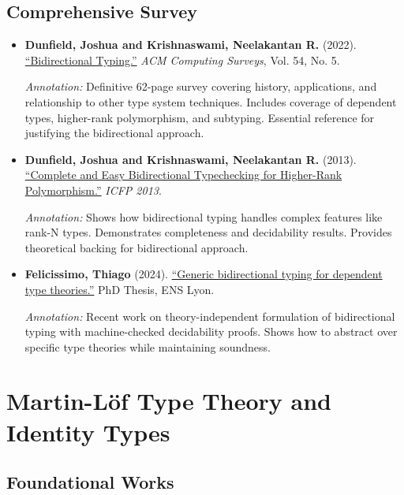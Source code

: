 \documentclass[11pt]{article}
\begin{document}
\subsection{Comprehensive Survey}

\begin{itemize}[leftmargin=*]
\item \textbf{Dunfield, Joshua and Krishnaswami, Neelakantan R.} (2022). \href{https://dl.acm.org/doi/10.1145/3450952}{``Bidirectional Typing.''} \emph{ACM Computing Surveys}, Vol. 54, No. 5.

\textit{Annotation:} Definitive 62-page survey covering history, applications, and relationship to other type system techniques. Includes coverage of dependent types, higher-rank polymorphism, and subtyping. Essential reference for justifying the bidirectional approach.

\item \textbf{Dunfield, Joshua and Krishnaswami, Neelakantan R.} (2013). \href{https://arxiv.org/abs/1310.2810}{``Complete and Easy Bidirectional Typechecking for Higher-Rank Polymorphism.''} \emph{ICFP 2013}.

\textit{Annotation:} Shows how bidirectional typing handles complex features like rank-N types. Demonstrates completeness and decidability results. Provides theoretical backing for bidirectional approach.

\item \textbf{Felicissimo, Thiago} (2024). \href{https://theses.hal.science/tel-04708691}{``Generic bidirectional typing for dependent type theories.''} PhD Thesis, ENS Lyon.

\textit{Annotation:} Recent work on theory-independent formulation of bidirectional typing with machine-checked decidability proofs. Shows how to abstract over specific type theories while maintaining soundness.

\end{itemize}

\section{Martin-Löf Type Theory and Identity Types}

\subsection{Foundational Works}
\end{document}
